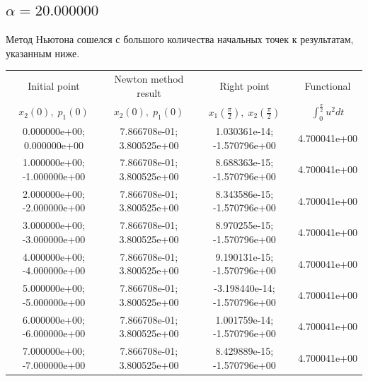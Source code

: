 \documentclass[titlepage]{article}
\def\l{\left}
\def\r{\right}
\begin{document}
\subsection{$\alpha = 20.000000$} 
Метод Ньютона сошелся с большого количества начальных точек к результатам, указанным ниже. \\ 
\begin{tabular}{ | c | c | c | c |} 
\hline 
Initial point  & Newton method result & Right point & Functional 
 \\ $x_2(0), \; p_1(0)$ & $x_2(0), \; p_1(0)$ & $x_1\l(\frac{\pi}{2}\r), \; x_2\l(\frac{\pi}{2}\r)$ & $\int_{0}^{\frac{\pi}{2}}u^2dt$  \\ \hline 
0.000000e+00; 0.000000e+00 & 7.866708e-01; 3.800525e+00 & 1.030361e-14; -1.570796e+00 & 4.700041e+00 \\ \hline 
1.000000e+00; -1.000000e+00 & 7.866708e-01; 3.800525e+00 & 8.688363e-15; -1.570796e+00 & 4.700041e+00 \\ \hline 
2.000000e+00; -2.000000e+00 & 7.866708e-01; 3.800525e+00 & 8.343586e-15; -1.570796e+00 & 4.700041e+00 \\ \hline 
3.000000e+00; -3.000000e+00 & 7.866708e-01; 3.800525e+00 & 8.970255e-15; -1.570796e+00 & 4.700041e+00 \\ \hline 
4.000000e+00; -4.000000e+00 & 7.866708e-01; 3.800525e+00 & 9.190131e-15; -1.570796e+00 & 4.700041e+00 \\ \hline 
5.000000e+00; -5.000000e+00 & 7.866708e-01; 3.800525e+00 & -3.198440e-14; -1.570796e+00 & 4.700041e+00 \\ \hline 
6.000000e+00; -6.000000e+00 & 7.866708e-01; 3.800525e+00 & 1.001759e-14; -1.570796e+00 & 4.700041e+00 \\ \hline 
7.000000e+00; -7.000000e+00 & 7.866708e-01; 3.800525e+00 & 8.429889e-15; -1.570796e+00 & 4.700041e+00 \\ \hline 
\end{tabular} 
\end{document}
